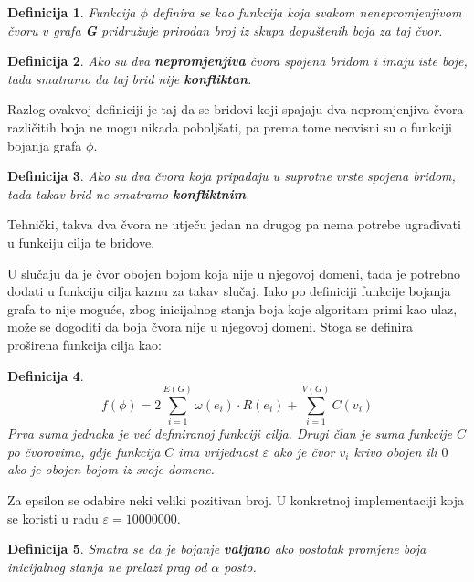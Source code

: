 \documentclass[times, utf8, diplomski, numeric]{fer}
\newtheorem{definition}{Definicija}
\begin{document}
\begin{definition}
Funkcija $\phi$ definira se kao funkcija koja svakom nenepromjenjivom čvoru $v$ grafa \textbf{G} pridružuje prirodan broj iz skupa dopuštenih boja za taj čvor.
\end{definition}

\begin{definition}
Ako su dva \textbf{nepromjenjiva} čvora spojena bridom i imaju iste boje, tada smatramo da taj brid nije \textbf{konfliktan}.
\end{definition}

Razlog ovakvoj definiciji je taj da se bridovi koji spajaju dva nepromjenjiva čvora različitih boja ne mogu nikada poboljšati, pa prema tome neovisni su o funkciji bojanja grafa $\phi$.

\begin{definition}
Ako su dva čvora koja pripadaju u suprotne vrste spojena bridom, tada takav brid ne smatramo \textbf{konfliktnim}.
\end{definition}

Tehnički, takva dva čvora ne utječu jedan na drugog pa nema potrebe  ugrađivati u funkciju cilja te bridove.

U slučaju da je čvor obojen bojom koja nije u njegovoj domeni, tada je potrebno dodati u funkciju cilja kaznu za takav slučaj. Iako po definiciji funkcije bojanja grafa to nije moguće, zbog inicijalnog stanja boja koje algoritam primi kao ulaz, može se dogoditi da boja čvora nije u njegovoj domeni. Stoga se definira proširena funkcija cilja kao:

\begin{definition}
\begin{equation}
\label{equ:funkcija_cilja}
f(\phi) = 2\sum_{i=1}^{E(G)} \omega(e_i) \cdot R(e_i) + \sum_{i=1}^{V(G)} C(v_i)
\end{equation}
Prva suma jednaka je već definiranoj funkciji cilja. Drugi član je suma funkcije $C$ po čvorovima, gdje funkcija $C$ ima vrijednost $\varepsilon$ ako je čvor $v_i$ krivo obojen ili $0$ ako je obojen bojom iz svoje domene.
\end{definition}

Za epsilon se odabire neki veliki pozitivan broj. U konkretnoj implementaciji koja se koristi u radu $\varepsilon=10000000$.

\begin{definition}
Smatra se da je bojanje \textbf{valjano} ako postotak promjene boja inicijalnog stanja ne prelazi prag od $\alpha$ posto.
\end{definition}
\end{document}
